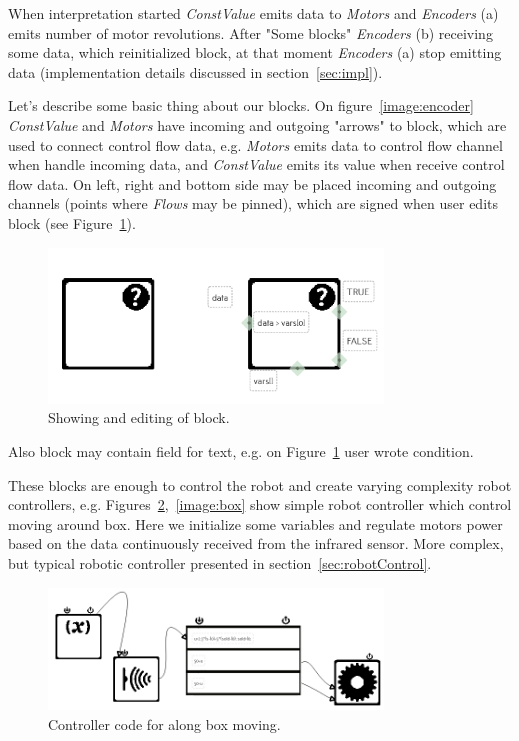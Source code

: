 \documentclass[conference,compsoc]{IEEEtran}
\begin{document}
When interpretation started \textit{ConstValue} emits data to \textit{Motors} and \textit{Encoders} (a) emits number of motor revolutions. After "Some blocks" \textit{Encoders} (b) receiving some data, which reinitialized block, at that moment \textit{Encoders} (a) stop emitting data (implementation details discussed in section~\ref{sec:impl}).

Let's describe some basic thing about our blocks. On figure~\ref{image:encoder} \textit{ConstValue} and \textit{Motors} have incoming and outgoing "arrows" to block, which are used to connect control flow data, e.g. \textit{Motors} emits data to control flow channel when handle incoming data, and \textit{ConstValue} emits its value when receive control flow data. On left, right and bottom side may be placed incoming and outgoing channels (points where \textit{Flows} may be pinned), which are signed when user edits block (see Figure~\ref{image:block}).
\begin{figure}[ht]
	\centering
	\includegraphics[width=3.5in]{block.png}
	\caption{Showing and editing of block.}
	\label{image:block}
\end{figure}
Also block may contain field for text, e.g. on Figure~\ref{image:block} user wrote condition.



These blocks are enough to control the robot and create varying complexity robot controllers, e.g. Figures~\ref{image:boxC},~\ref{image:box} show simple robot controller which control moving around box. Here we initialize some variables and regulate motors power based on the data continuously received from the infrared sensor. More complex, but typical robotic controller presented in section~\ref{sec:robotControl}. 

\begin{figure}[ht]
	\centering
	\includegraphics[width=3.5in]{alongBoxCode.png}
	\caption{Controller code for along box moving.}
	\label{image:boxC}
\end{figure}
\end{document}
